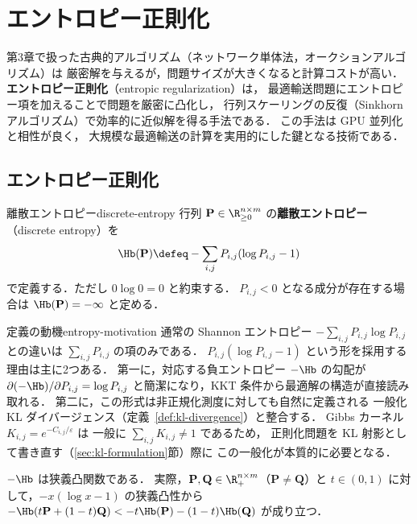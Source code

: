\chapter{エントロピー正則化}
\label{ch:entropic}

第3章で扱った古典的アルゴリズム（ネットワーク単体法，オークションアルゴリズム）は
厳密解を与えるが，問題サイズが大きくなると計算コストが高い．
\textbf{エントロピー正則化}（entropic regularization）は，
最適輸送問題にエントロピー項を加えることで問題を厳密に凸化し，
行列スケーリングの反復（Sinkhorn アルゴリズム）で効率的に近似解を得る手法である．
この手法は GPU 並列化と相性が良く，
大規模な最適輸送の計算を実用的にした鍵となる技術である．

\section{エントロピー正則化}
\label{sec:entropic-reg}

\begin{definition}{離散エントロピー}{discrete-entropy}
  行列 $\mathbf{P} \in \R_{\geq 0}^{n \times m}$ の\textbf{離散エントロピー}（discrete entropy）を
  \[
    \Hb(\mathbf{P}) \defeq - \sum_{i,j} P_{i,j} (\log P_{i,j} - 1)
  \]
  で定義する．ただし $0 \log 0 = 0$ と約束する．
  $P_{i,j} < 0$ となる成分が存在する場合は $\Hb(\mathbf{P}) = -\infty$ と定める．
\end{definition}

\begin{remark}{定義の動機}{entropy-motivation}
  通常の Shannon エントロピー $-\sum_{i,j} P_{i,j} \log P_{i,j}$ との違いは
  $\sum_{i,j} P_{i,j}$ の項のみである．
  $P_{i,j}(\log P_{i,j} - 1)$ という形を採用する理由は主に2つある．
  第一に，対応する負エントロピー $-\Hb$ の勾配が
  $\partial(-\Hb)/\partial P_{i,j} = \log P_{i,j}$
  と簡潔になり，KKT 条件から最適解の構造が直接読み取れる．
  第二に，この形式は非正規化測度に対しても自然に定義される
  一般化 KL ダイバージェンス（定義~\ref{def:kl-divergence}）と整合する．
  Gibbs カーネル $K_{i,j} = e^{-C_{i,j}/\varepsilon}$ は
  一般に $\sum_{i,j} K_{i,j} \neq 1$ であるため，
  正則化問題を KL 射影として書き直す（\ref{sec:kl-formulation}節）際に
  この一般化が本質的に必要となる．
\end{remark}

$-\Hb$ は狭義凸関数である．
実際，$\mathbf{P}, \mathbf{Q} \in \R_{+}^{n \times m}$（$\mathbf{P} \neq \mathbf{Q}$）と
$t \in (0, 1)$ に対して，$-x(\log x - 1)$ の狭義凸性から
$-\Hb(t\mathbf{P} + (1-t)\mathbf{Q}) < -t\Hb(\mathbf{P}) - (1-t)\Hb(\mathbf{Q})$
が成り立つ．


